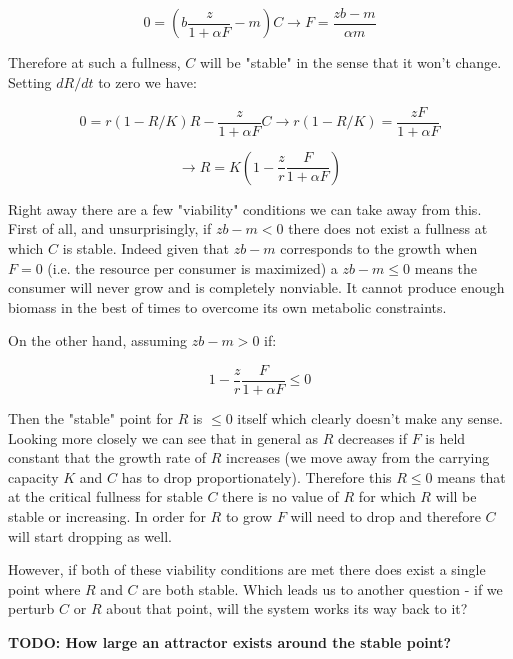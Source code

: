 \documentclass[11pt,a5paper]{book}
\begin{document}
$$0 = \left( b\frac{z}{1+\alpha F}-m \right)C \rightarrow F= \frac{zb-m}{\alpha m}$$

Therefore at such a fullness, $C$ will be "stable" in the sense that it won't change. Setting $dR/dt$ to zero we have:

$$0 = r(1-R/K)R-\frac{z}{1+\alpha F}C \rightarrow r(1-R/K)=\frac{zF}{1+\alpha F}$$

$$\rightarrow R = K\left( 1 - \frac{z}{r}\frac{F}{1+\alpha F} \right)$$

Right away there are a few "viability" conditions we can take away from this. First of all, and unsurprisingly, if $zb-m<0$ there does not exist a fullness at which $C$ is stable. Indeed given that $zb-m$ corresponds to the growth when $F=0$ (i.e. the resource per consumer is maximized) a $zb-m\leq 0 $ means the consumer will never grow and is completely nonviable. It cannot produce enough biomass in the best of times to overcome its own metabolic constraints. 

On the other hand, assuming $zb-m>0$ if: 

$$ 1 - \frac{z}{r}\frac{F}{1+\alpha F} \leq 0$$

Then the "stable" point for $R$ is $\leq 0$ itself which clearly doesn't make any sense. Looking more closely we can see that in general as $R$ decreases if $F$ is held constant that the growth rate of $R$ increases (we move away from the carrying capacity $K$ and $C$ has to drop proportionately). Therefore this $R\leq 0 $ means that at the critical fullness for stable $C$ there is no value of $R$ for which $R$ will be stable or increasing. In order for $R$ to grow $F$ will need to drop and therefore $C$ will start dropping as well. 
\newline

However, if both of these viability conditions are met there does exist a single point where $R$ and $C$ are both stable. Which leads us to another question - if we perturb $C$ or $R$ about that point, will the system works its way back to it? 


\textbf{TODO: How large an attractor exists around the stable point?}
\end{document}
